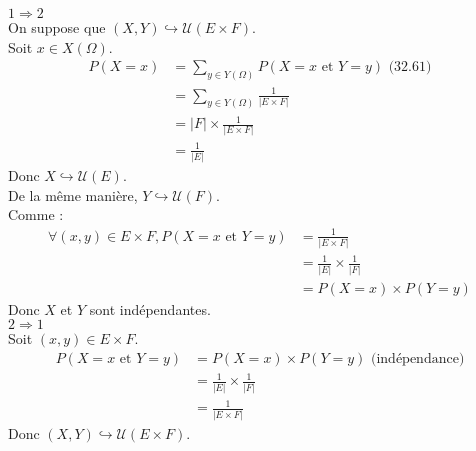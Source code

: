 \documentclass[../main.tex]{subfiles}
\begin{document}
$\boxed{1\Rightarrow 2}$ \\
On suppose que $(X, Y) \hookrightarrow \mathcal{U}(E \times F)$. \\
Soit $x\in X(\Omega)$. 
\begin{align*}
    P(X = x) &= \sum_{y\in Y(\Omega)} P(X = x \text{ et } Y = y) \text{ (32.61)} \\
    &= \sum_{y\in Y(\Omega)} \frac{1}{|E\times F|} \\
    &= |F| \times \frac{1}{|E\times F|} \\
    &= \frac{1}{|E|}
\end{align*}
Donc $X \hookrightarrow \mathcal{U}(E)$. \\
De la même manière, $Y \hookrightarrow \mathcal{U}(F)$. \\
Comme : 
\begin{align*}
    \forall (x, y)\in E\times F, P(X = x \text{ et } Y = y) &= \frac{1}{|E\times F|} \\
    &= \frac{1}{|E|} \times \frac{1}{|F|} \\
    &= P(X = x) \times P(Y = y)
\end{align*}
Donc $X$ et $Y$ sont indépendantes. \\

$\boxed{2\Rightarrow 1}$ \\
Soit $(x, y)\in E\times F$. 
\begin{align*}
    P(X = x \text{ et } Y = y) &= P(X = x) \times P(Y = y) \text{ (indépendance)} \\
    &= \frac{1}{|E|} \times \frac{1}{|F|} \\
    &= \frac{1}{|E\times F|}
\end{align*}
Donc $(X, Y) \hookrightarrow \mathcal{U}(E\times F)$.
\end{document}
